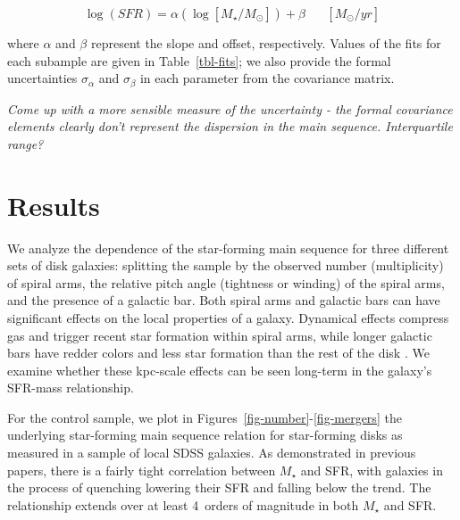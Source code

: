 \documentclass{emulateapj}
\begin{document}
\begin{equation}
\log(SFR) = \alpha(\log[M_\star/M_\odot]) + \beta \hspace{20pt}[M_\odot/yr]
\label{eqn-linearfit}
\end{equation}

\noindent where $\alpha$ and $\beta$ represent the slope and offset, respectively. Values of the fits for each subample are given in Table~\ref{tbl-fits}; we also provide the formal uncertainties $\sigma_\alpha$ and $\sigma_\beta$ in each parameter from the covariance matrix.

\emph{Come up with a more sensible measure of the uncertainty - the formal covariance elements clearly don't represent the dispersion in the main sequence. Interquartile range?}


\section{Results} \label{sec-results}

We analyze the dependence of the star-forming main sequence for three different sets of disk galaxies: splitting the sample by the observed number (multiplicity) of spiral arms, the relative pitch angle (tightness or winding) of the spiral arms, and the presence of a galactic bar. Both spiral arms and galactic bars can have significant effects on the local properties of a galaxy. Dynamical effects compress gas and trigger recent star formation within spiral arms, while longer galactic bars have redder colors and less star formation than the rest of the disk \citep{hoy11}. We examine whether these kpc-scale effects can be seen long-term in the galaxy's SFR-mass relationship. 

For the control sample, we plot in Figures~\ref{fig-number}-\ref{fig-mergers} the underlying star-forming main sequence relation for star-forming disks as measured in a sample of local SDSS galaxies. As demonstrated in previous papers, there is a fairly tight correlation between $M_\star$ and SFR, with galaxies in the process of quenching lowering their SFR and falling below the trend. The relationship extends over at least 4~orders of magnitude in both $M_\star$ and SFR. 
\end{document}

